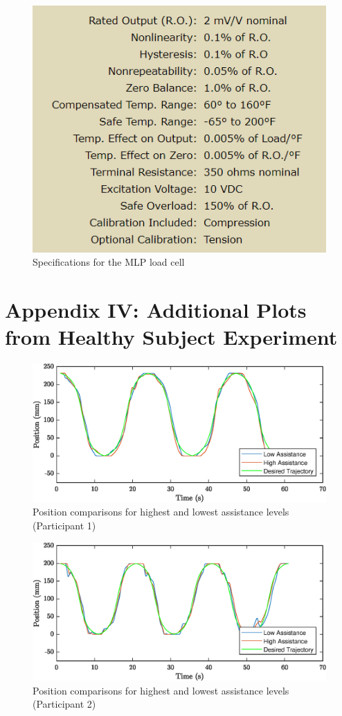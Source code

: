 \documentclass[12pt]{report}
\begin{document}
	\begin{figure}[h] 
		\centering
		\includegraphics[width=0.75\linewidth]{load_cell_spec}
		\caption{Specifications for the MLP load cell}
		\label{fig:load_cell}
	\end{figure}



\chapter*{Appendix IV: Additional Plots from Healthy Subject Experiment} \label{ap:plots}

\begin{figure}[h] 
	\centering
	\includegraphics[width=\linewidth]{pos1}
	\caption{Position comparisons for highest and lowest assistance levels (Participant 1)}
	\label{fig:pos1}
\end{figure}

\begin{figure}[h] 
	\centering
	\includegraphics[width=\linewidth]{pos2}
	\caption{Position comparisons for highest and lowest assistance levels (Participant 2)}
	\label{fig:pos2}
\end{figure}
\end{document}
